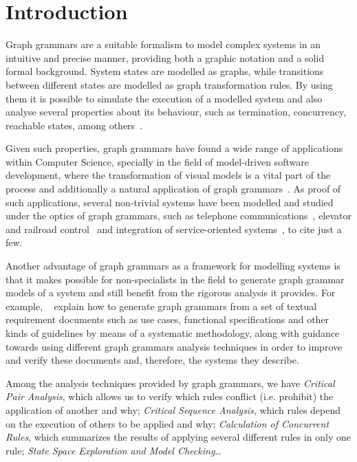 \chapter{Introduction}

Graph grammars are a suitable formalism to model complex systems in an intuitive and precise manner, providing both a graphic notation and a solid formal background. System states are modelled as graphs, while transitions between different states are modelled as graph transformation rules. By using them it is possible to simulate the execution of a modelled system and also analyse several properties about its behaviour, such as termination, concurrency, reachable states, among others~\cite{Ehrig2006}.


Given such properties, graph grammars have found a wide range of applications within Computer Science, specially in the field of model-driven software development, where the transformation of visual models is a vital part of the process and additionally a natural application of graph grammars~\cite{Rozenberg1997}. As proof of such applications, several non-trivial systems have been modelled and studied under the optics of graph grammars, such as telephone communications~\cite{Ribeiro1996}, elevator and railroad control~\cite{Lambers2010, Pennemann2009} and integration of service-oriented systems~\cite{Giese}, to cite just a few.

Another advantage of graph grammars as a framework for modelling systems is that it makes possible for non-specialists in the field to generate graph grammar models of a system and still benefit from the rigorous analysis it provides. For example, ~\cite{Junior2015,BezerraWEIT2016,Cota2017} explain how to generate graph grammars from a set of textual requirement documents such as use cases, functional specifications and other kinds of guidelines by means of a systematic methodology, along with guidance towards using different graph grammars analysis techniques in order to improve and verify these documents and, therefore, the systems they describe.

Among the analysis techniques provided by graph grammars, we have \emph{Critical Pair Analysis},  which allows us to verify which rules conflict (i.e. prohibit) the application of another and why; \emph{Critical Sequence Analysis}, which rules depend on the execution of others to be applied and why; \emph{Calculation of Concurrent Rules}, which summarizes the results of applying several different rules in only one rule; \emph{State Space Exploration and Model Checking}\ldots

